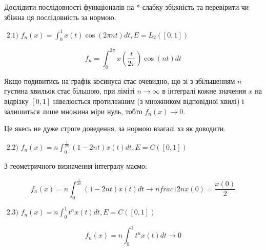 \begin{tcolorbox}[title=Завдання 2]

    Дослідити послідовності функціоналів на *-слабку збіжність та перевірити чи збіжна ця послідовність за нормою.

    $
    \text { 2.1) } f_{n}(x)=\int_{0}^{1} x(t) \cos (2 \pi n t) d t, E=L_{2}([0,1])
    $

    $$f_n = \int_{0}^{2\pi} x(\frac{t}{2\pi}) \cos (n t) d t$$

    Якщо подивитись на графік косинуса стає очевидно, що зі з збільшенням $n$ густина 
    хвильок стає більшою, при ліміті $n \rightarrow \infty$ в інтегралі кожне значення 
    $x$ на відрізку $[0, 1]$ нівелюється протилежним (з множником відповідної хвилі) 
    і залишиться лише множина міри нуль, тобто $f_n(x) \rightarrow 0$.

    Це якесь не дуже строге доведення, за нормою взагалі хз як доводити.


    $
    \text { 2.2) } f_{n}(x)=n \int_{0}^{\frac{1}{2 n}}(1-2 n t) x(t) d t, E=C([0,1])
    $
    

    З геометричного визначення інтегралу маємо:

    $$f_n(x) = n \int_{0}^{\frac{1}{2n}}(1-2nt)x(t)dt \rightarrow 
    n frac{1}{2n}x(0) = \frac{x(0)}{2} $$

    
    $
    \text { 2.3) } f_{n}(x)=n \int_{0}^{1} t^{n} x(t) d t, E=C([0,1])
    $

    $$f_n(x) = n \int_{0}^{1} t^{n} x(t) d t \rightarrow 0 $$
\end{tcolorbox}